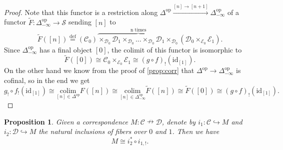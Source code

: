 \documentclass[a4paper, reqno]{amsart}
\newtheorem{prop}[theorem]{Proposition}
\theoremstyle{definition}
\newcommand\cC{\mathscr C}
\newcommand\cD{\mathscr D}
\newcommand\cE{\mathscr E}
\newcommand\cS{\mathscr S}
\newcommand\id{\mathrm{id}}
\newcommand\op{\mathrm{op}}
\newcommand\colim{\mathrm{colim}}
\newcommand\bydef{\overset{\mathrm{def}}{=}}
\begin{document}
\begin{proof}
Note that this functor is a restriction along $\Delta^\op\xrightarrow{[n]\rightarrow[n+1]}\Delta^\op_{-\infty}$ of a functor $\widetilde{F}:\Delta^\op_{-\infty}\rightarrow\cS$ sending $[n]$ to \[\widetilde{F}([n])\bydef(\cC_0)\overbrace{\times_{\cD_0}\cD_1\times_{\cD_0}...\times_{\cD_0}\cD_1\times_{\cD_0}}^\text{n times}(\cD_0\times_{\cE_0}\cE_1).\] 
Since $\Delta^\op_{-\infty}$ has a final object $[0]$, the colimit of this functor is isomorphic to \[\widetilde{F}([0])\cong\cC_0\times_{\cE_0}\cE_1\cong(g\circ f)_!(\id_{[1]}).\]
On the other hand we know from the proof of \cref{prop:corr} that $\Delta^\op\rightarrow\Delta^\op_{-\infty}$ is cofinal, so in the end we get
\[g_!\circ f_!(\id_{[1]})\cong\underset{[n]\in\Delta^\op}{\colim}F([n])\cong\underset{[n]\in\Delta^\op_{-\infty}}{\colim}\widetilde{F}([n])\cong\widetilde{F}([0])\cong (g\circ f)_!(\id_{[1]}).\]
\end{proof}
\begin{prop}\label{prop:fact_1}
Given a correspondence $M:\cC\nrightarrow\cD$, denote by $i_1:\cC\hookrightarrow M$ and $i_2:\cD\hookrightarrow M$ the natural inclusions of fibers over $0$ and $1$. Then we have
\[M\cong i_2^*\circ i_{1,!}.\]
\end{prop}
\end{document}
